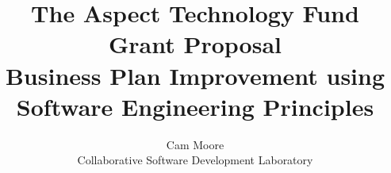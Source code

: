 \documentclass [11pt] {article}
\begin{document}
\title{The Aspect Technology Fund Grant Proposal \\
Business Plan Improvement using Software Engineering Principles}
\author{Cam Moore \\
Collaborative Software Development Laboratory}


\maketitle




%

%

%











 
%

\end{document}
